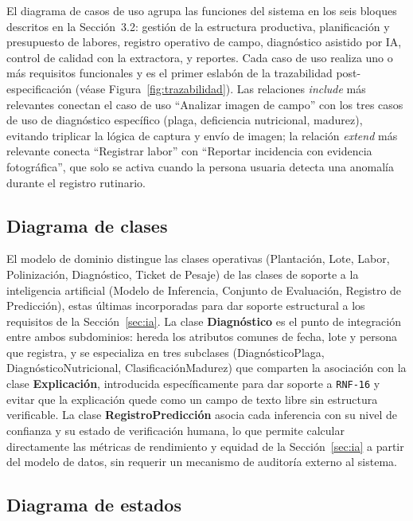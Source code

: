 \documentclass[11pt,a4paper]{article}
\newcommand{\id}[1]{\texttt{#1}}
\begin{document}
El diagrama de casos de uso agrupa las funciones del sistema en los seis bloques descritos en la
Sección~3.2: gestión de la estructura productiva, planificación y presupuesto de labores, registro
operativo de campo, diagnóstico asistido por IA, control de calidad con la extractora, y reportes.
Cada caso de uso realiza uno o más requisitos funcionales y es el primer eslabón de la trazabilidad
post-especificación (véase Figura~\ref{fig:trazabilidad}). Las relaciones \emph{include} más
relevantes conectan el caso de uso ``Analizar imagen de campo'' con los tres casos de uso de
diagnóstico específico (plaga, deficiencia nutricional, madurez), evitando triplicar la lógica de
captura y envío de imagen; la relación \emph{extend} más relevante conecta ``Registrar labor'' con
``Reportar incidencia con evidencia fotográfica'', que solo se activa cuando la persona usuaria
detecta una anomalía durante el registro rutinario.

\subsection{Diagrama de clases}

El modelo de dominio distingue las clases operativas (Plantación, Lote, Labor, Polinización,
Diagnóstico, Ticket de Pesaje) de las clases de soporte a la inteligencia artificial (Modelo de
Inferencia, Conjunto de Evaluación, Registro de Predicción), estas últimas incorporadas para dar
soporte estructural a los requisitos de la Sección~\ref{sec:ia}. La clase \textbf{Diagnóstico} es el
punto de integración entre ambos subdominios: hereda los atributos comunes de fecha, lote y persona
que registra, y se especializa en tres subclases (DiagnósticoPlaga, DiagnósticoNutricional,
ClasificaciónMadurez) que comparten la asociación con la clase \textbf{Explicación}, introducida
específicamente para dar soporte a \id{RNF-16} y evitar que la explicación quede como un campo de
texto libre sin estructura verificable. La clase \textbf{RegistroPredicción} asocia cada inferencia
con su nivel de confianza y su estado de verificación humana, lo que permite calcular directamente
las métricas de rendimiento y equidad de la Sección~\ref{sec:ia} a partir del modelo de datos, sin
requerir un mecanismo de auditoría externo al sistema.

\subsection{Diagrama de estados}
\end{document}
